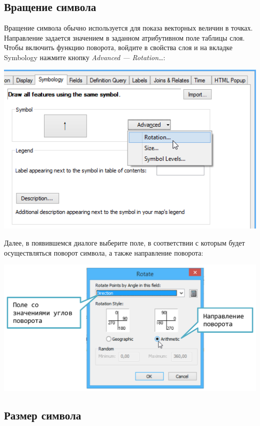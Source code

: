\documentclass[12pt,]{book}
\begin{document}
\hypertarget{manual-vector-rotation}{%
\subsection{Вращение символа}\label{manual-vector-rotation}}

Вращение символа обычно используется для показа векторных величин в точках. Направление задается значением в заданном атрибутивном поле таблицы слоя. Чтобы включить функцию поворота, войдите в свойства слоя и на вкладке Symbology нажмите кнопку \emph{Advanced --- Rotation\ldots{}}:

\includegraphics{images/Appendix/image27.png}

Далее, в появившемся диалоге выберите поле, в соответствии с которым будет осуществляться поворот символа, а также направление поворота:

\includegraphics{images/Appendix/image28.png}

\hypertarget{manual-vector-size}{%
\subsection{Размер символа}\label{manual-vector-size}}
\end{document}
